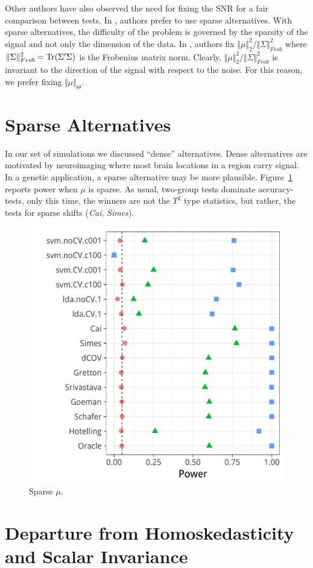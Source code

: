 \documentclass[]{bio}
\begin{document}
Other authors have also observed the need for fixing the SNR for a fair comparison between tests.
In \cite{ramdas2015decreasing}, authors prefer to use sparse alternatives.
With sparse alternatives, the difficulty of the problem is governed by the sparsity of the signal and not only the dimension of the data. 
In \cite{chen2010two}, authors fix $\Vert \mu \Vert_2^2/\Vert \Sigma \Vert^2_{Frob}$ where $\Vert \Sigma \Vert^2_{Frob}=\operatorname{Tr}(\Sigma'\Sigma)$ is the Frobenius matrix norm. 
Clearly, $\Vert \mu \Vert_2^2/\Vert \Sigma \Vert^2_{Frob}$ is invariant to the direction of the signal with respect to the noise. 
For this reason, we prefer fixing $\Vert \mu \Vert_\Theta$.






\section{Sparse Alternatives}
\label{sec:sparse}

In our set of simulations we discussed ``dense'' alternatives.
Dense alternatives are motivated by neuroimaging where most brain locations in a region carry signal.
In a genetic application, a sparse alternative may be more plausible. 
Figure~\ref{fig:sparse} reports power when $\mu$ is sparse. 
As usual, two-group tests dominate accuracy-tests, only this time, the winners are not the $T^2$ type statistics, but rather, the tests for sparse shifts (\emph{Cai}, \emph{Simes}).

\begin{figure}[h]
	\centering
	\centering
	\includegraphics[width=0.5\columnwidth]{"art/file34"}
	\caption{Sparse $\mu$.}  
	\label{fig:sparse}	
\end{figure}





\section{Departure from Homoskedasticity and Scalar Invariance}
\end{document}
